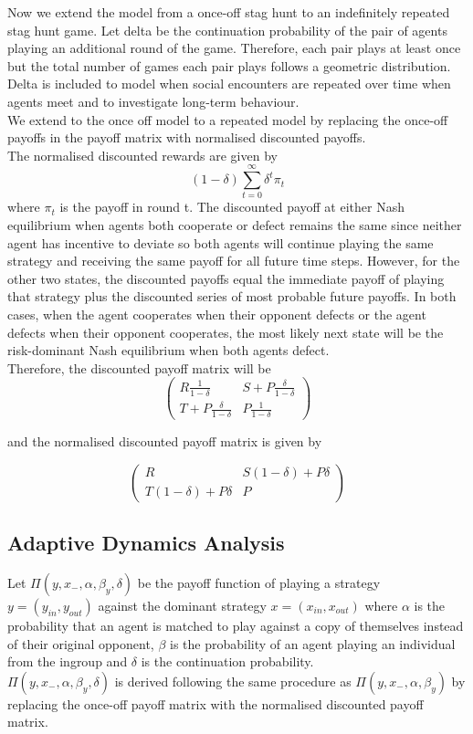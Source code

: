 \documentclass[]{llncs}
\begin{document}
Now we extend the model from a once-off stag hunt to an indefinitely repeated stag hunt game. Let delta be the continuation probability of the pair of agents playing an additional round of the game. Therefore, each pair plays at least once but the total number of games each pair plays follows a geometric distribution. Delta is included to model when social encounters are repeated over time when agents meet and to investigate long-term behaviour. 
\\
We extend to the once off model to a repeated model by replacing the once-off payoffs in the payoff matrix with normalised discounted payoffs. 
\\
The normalised discounted rewards are given by 
\[
(1-\delta) \sum_{t=0}^{\infty} \delta^{t}\pi_t 
\]
where $\pi_t$ is the payoff in round t. 
The discounted payoff at either Nash equilibrium when agents both cooperate or defect remains the same since neither agent has incentive to deviate so both agents will continue playing the same strategy and receiving the same payoff for all future time steps.  However, for the other two states, the discounted payoffs equal the immediate payoff of playing that strategy plus the discounted series of most probable future payoffs. In both cases, when the agent cooperates when their opponent defects or the agent defects when their opponent cooperates, the most likely next state will be the risk-dominant Nash equilibrium when both agents defect.  \\
Therefore, the discounted payoff matrix will be 
\[
  \begin{pmatrix} 
   R\frac{1}{1-\delta} & S + P\frac{\delta}{1-\delta}  \\
   T + P\frac{\delta}{1-\delta}  & P\frac{1}{1-\delta} 
   \end{pmatrix} 
\]

and the normalised discounted payoff matrix is given by 

\[
  \begin{pmatrix} 
   R & S(1-\delta) + P\delta  \\
   T(1-\delta) + P\delta  & P
   \end{pmatrix} 
\]


\subsection{Adaptive Dynamics Analysis}

Let $ \Pi ( y, x_{-}, \alpha, \beta_y, \delta)$ be the payoff function of playing a strategy $y = (y_{in}, y_{out}) $ against the dominant strategy $x = (x_{in}, x_{out})$  where $\alpha$ is the probability that an agent is matched to play against a copy of themselves instead of their original opponent, $\beta$ is the probability of an agent playing an individual from the ingroup and $\delta$ is the continuation probability.
\\
$ \Pi ( y, x_{-}, \alpha, \beta_y, \delta)$ is derived following the same procedure as $ \Pi ( y, x_{-}, \alpha, \beta_y)$ by replacing the once-off payoff matrix with the normalised discounted payoff matrix.
\end{document}
